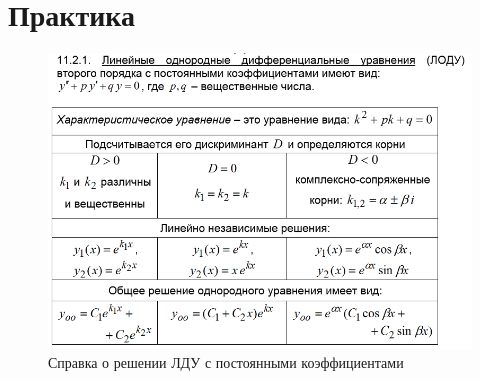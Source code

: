 \section{Практика}







\begin{figure}[H]
	\centering
	\includegraphics[width=.8\linewidth]{img/ldu.png}
	\caption{Справка о решении ЛДУ с постоянными коэффициентами}
\end{figure}






